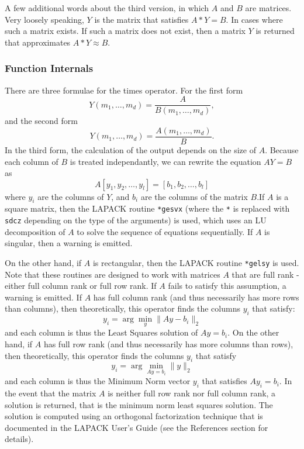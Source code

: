A few additional words about the third version, in which $A$ and $B$ are matrices.  Very loosely speaking, $Y$ is the matrix that satisfies $A * Y = B$.  In cases where such a matrix exists.  If such a matrix does not exist, then a matrix $Y$ is returned that approximates $A * Y \approx B$.
\subsubsection{Function Internals}
There are three formulae for the times operator.  For the first form
\[
Y(m_1,\ldots,m_d) = \frac{A}{B(m_1,\ldots,m_d)},
\]
and the second form
\[
Y(m_1,\ldots,m_d) = \frac{A(m_1,\ldots,m_d)}{B}.
\]
In the third form, the calculation of the output depends on the size of $A$. Because each column of $B$ is treated independantly, we can rewrite the equation $A Y = B$ as
\[
  A [y_1, y_2,\ldots, y_l] = [b_1, b_2, \ldots, b_l]
\]
where $y_i$ are the columns of $Y$, and $b_i$ are the columns of the matrix $B$.If $A$ is a square matrix, then the LAPACK routine \verb|*gesvx| (where the \verb|*| is replaced with \verb|sdcz| depending on the type of the arguments) is used, which uses an LU decomposition of $A$ to solve the sequence of equations sequentially.  If $A$ is singular, then a warning is emitted. 

On the other hand, if $A$ is rectangular, then the LAPACK routine \verb|*gelsy| is used.  Note that these routines are designed to work with matrices $A$ that are full rank - either full column rank or full row rank.  If $A$ fails to satisfy this assumption, a warning is emitted.  If $A$ has full column rank (and thus necessarily has more rows than columns), then theoretically, this operator finds the columns $y_i$ that satisfy:
\[
  y_i = \arg \min_y \| A y - b_i \|_2
\]
and each column is thus the Least Squares solution of $A y = b_i$.  On the other hand, if $A$ has full row rank (and thus necessarily has more columns than rows), then theoretically, this operator finds the columns $y_i$ that satisfy
\[
  y_i = \arg \min_{A y = b_i} \| y \|_2
\]
and each column is thus the Minimum Norm vector $y_i$ that satisfies $A y_i = b_i$.  
In the event that the matrix $A$ is neither full row rank nor full column rank, a solution is returned, that is the minimum norm least squares solution.  The solution is computed using an orthogonal factorization technique that is documented in the LAPACK User's Guide (see the References section for details).
